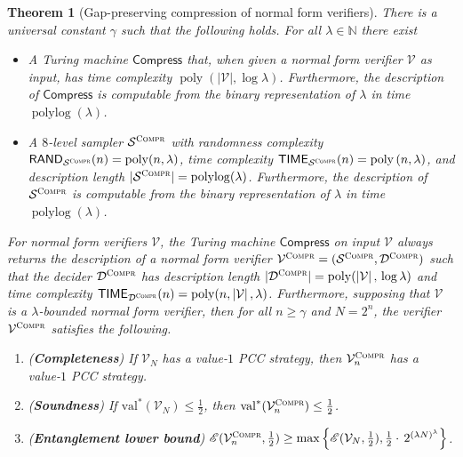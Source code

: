 \documentclass[11pt]{article}
\newtheorem{theorem}{Theorem}[section]
\theoremstyle{definition}
\newcommand{\N}{\ensuremath{\mathbb{N}}}
\DeclareMathOperator{\poly}{poly}
\newcommand{\val}{\ensuremath{\mathrm{val}}}
\DeclareMathOperator{\polylog}{polylog}
\newcommand{\abs}[1]{\left\vert {#1} \right\vert}
\newcommand{\sampler}{\mathcal{S}}
\newcommand{\decider}{\mathcal{D}}
\newcommand{\verifier}{\mathcal{V}}
\newcommand{\Ent}{\mathscr{E}}
\newcommand{\compr}{\textsc{Compr}}
\newcommand{\TIME}{\mathsf{TIME}}
\newcommand{\RAND}{\mathsf{RAND}}
\newcommand{\tmstyle}[1]{\ensuremath{\mathsf{#1}}}
\newcommand{\Compress}{\tmstyle{Compress}}
\begin{document}
\begin{theorem}[Gap-preserving compression of normal form verifiers]
  \label{thm:compression}
	There is a universal constant $\gamma$ such that the following holds.
  For all $\lambda \in \N$ there exist
	\begin{itemize}
  \item A Turing machine $\Compress$ that, when given a normal form verifier
    $\verifier$ as input, has time complexity $\poly(\abs{\verifier}, \log
    \lambda)$.
    Furthermore, the description of $\Compress$ is computable from the binary
    representation of $\lambda$ in time $\polylog (\lambda)$.
  \item A $8$-level sampler $\sampler^\compr$ with randomness complexity
    $\RAND_{\sampler^\compr}(n) = \poly (n,\lambda)$, time complexity
    $\TIME_{\sampler^\compr}(n) = \poly \left (n, \lambda \right )$, and
    description length $|\sampler^\compr| = \polylog(\lambda)$.
		Furthermore, the description of $\sampler^\compr$ is computable from the
    binary representation of $\lambda$ in time $\polylog (\lambda)$.
  \end{itemize}
	For normal form verifiers $\verifier$, the Turing machine $\Compress$ on input
  $\verifier$ always returns the description of a normal form verifier
  $\verifier^\compr = (\sampler^\compr, \decider^\compr)$ such that the decider
  $\decider^\compr$ has description length $|\decider^\compr| =
  \poly(\abs{\verifier},\, \log \lambda)$ and time complexity
  $\TIME_{\decider^\compr}(n) = \poly (n, \abs{\verifier}, \lambda)$.
  Furthermore, supposing that $\verifier$ is a $\lambda$-bounded normal form
  verifier, then for all $n \geq \gamma$ and $N = 2^n$,
  the verifier $\verifier^\compr$ satisfies the following.
	\begin{enumerate}
  \item \label{enu:compr-completeness} (\textbf{Completeness}) If $\verifier_N$
    has a value-$1$ PCC strategy, then $\verifier^\compr_n$ has a value-$1$ PCC
    strategy.
  \item \label{enu:compr-soundness} (\textbf{Soundness}) If
    $\val^*(\verifier_{N}) \leq \frac{1}{2}$, then $\val^*(\verifier_{n}^\compr)
    \leq \frac{1}{2}$.
  \item \label{enu:compr-entanglement} (\textbf{Entanglement lower bound})
    $\Ent(\verifier_{n}^\compr,\frac{1}{2}) \geq \max \left \{
      \Ent(\verifier_{N}, \frac{1}{2}), \frac{1}{2} \cdot \, 2^{(\lambda
        N)^\lambda} \right \}$.
  \end{enumerate}
\end{theorem}
\end{document}
